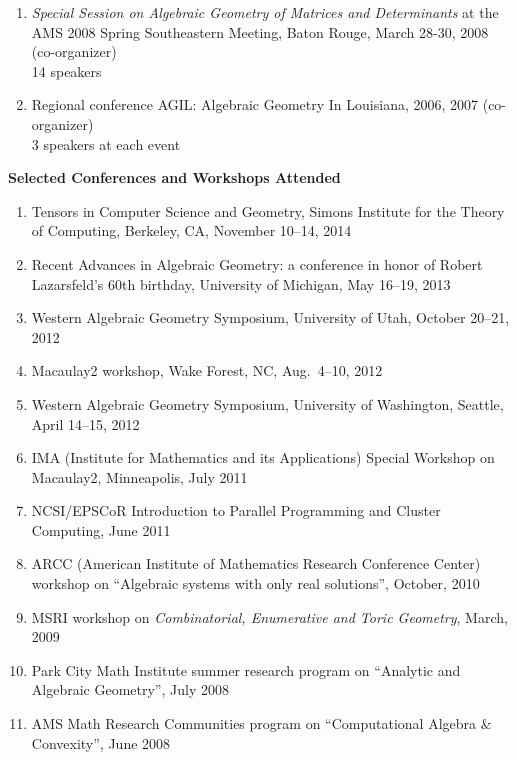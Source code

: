\documentclass[12pt]{article}
\begin{document}
\begin{enumerate}
\item \textit{Special Session on Algebraic Geometry of Matrices and Determinants}
at the AMS 2008 Spring Southeastern Meeting, Baton Rouge, March 28-30, 2008 (co-organizer) \\
14 speakers

\item Regional conference AGIL: Algebraic Geometry In Louisiana, 2006, 2007 (co-organizer) \\
3 speakers at each event

\end{enumerate}


\textbf{Selected Conferences and Workshops Attended}
\begin{enumerate}
\item Tensors in Computer Science and Geometry, Simons Institute for the Theory of Computing, Berkeley, CA, November 10--14, 2014
\item Recent Advances in Algebraic Geometry: a conference in honor of Robert Lazarsfeld's 60th birthday,
University of Michigan, May 16--19, 2013
\item Western Algebraic Geometry Symposium, University of Utah, October 20--21, 2012
\item Macaulay2 workshop, Wake Forest, NC, Aug.~4--10, 2012
\item Western Algebraic Geometry Symposium, University of Washington, Seattle, April 14--15, 2012
\item IMA (Institute for Mathematics and its Applications) Special Workshop on Macaulay2, Minneapolis, July 2011
\item NCSI/EPSCoR Introduction to Parallel Programming and Cluster Computing, June 2011
\item ARCC (American Institute of Mathematics Research Conference Center) workshop on
``Algebraic systems with only real solutions'', October, 2010
\item MSRI workshop on \textit{Combinatorial, Enumerative and Toric Geometry}, March, 2009
\item Park City Math Institute summer research program on ``Analytic and Algebraic Geometry'', July 2008
\item AMS Math Research Communities program on ``Computational Algebra \& Convexity'', June 2008
\end{enumerate}
\end{document}
